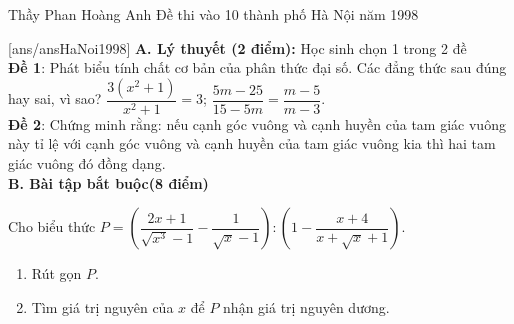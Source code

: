 \begin{name}
	{Thầy Phan Hoàng Anh}
	{Đề thi vào 10 thành phố Hà Nội năm 1998}
\end{name}
\setcounter{ex}{0}
[ans/ansHaNoi1998]
\noindent
\textbf{A. Lý thuyết (2 điểm):}  Học sinh chọn 1 trong 2 đề\\
\textbf{Đề 1}: Phát biểu tính chất cơ bản của phân thức đại số. Các đẳng thức sau đúng hay sai, vì sao?
$\dfrac{3(x^2+1)}{x^2+1}=3$; $\dfrac{5m-25}{15-5m}=\dfrac{m-5}{m-3}$.\\
\textbf{Đề 2}: Chứng minh rằng: nếu cạnh góc vuông và cạnh huyền của tam giác vuông này tỉ lệ với 	cạnh góc vuông và cạnh huyền của tam giác vuông kia thì hai tam giác vuông đó đồng dạng.\\
\textbf{B. Bài tập bắt buộc(8 điểm)}
\begin{ex}%
	Cho biểu thức  $P=\left(\dfrac{2x+1}{\sqrt{x^3}-1}-\dfrac{1}{\sqrt{x}-1}\right):\left( 1-\dfrac{x+4}{x+\sqrt{x}+1}\right)$.
	\begin{enumerate}
		\item 	Rút gọn $P$.
		\item	Tìm giá trị nguyên của $x$ để $P$ nhận giá trị nguyên dương.
	\end{enumerate}
\end{ex} 

